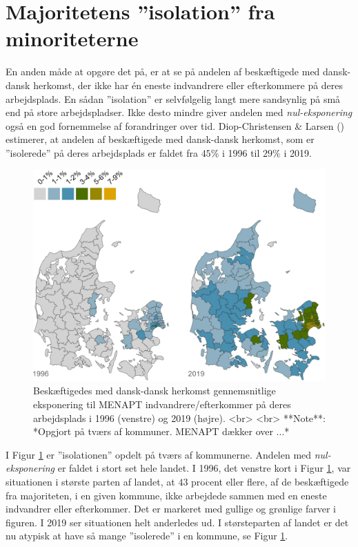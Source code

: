\documentclass[
]{book}
\begin{document}
\section{Majoritetens ''isolation'' fra minoriteterne}\label{majoritetens-isolation-fra-minoriteterne}

En anden måde at opgøre det på, er at se på andelen af beskæftigede med dansk-dansk herkomst, der ikke har én eneste indvandrere eller efterkommere på deres arbejdsplads. En sådan ''isolation'' er selvfølgelig langt mere sandsynlig på små end på store arbejdspladser. Ikke desto mindre giver andelen med \emph{nul-eksponering} også en god fornemmelse af forandringer over tid. Diop-Christensen \& Larsen () estimerer, at andelen af beskæftigede med dansk-dansk herkomst, som er ''isolerede'' på deres arbejdsplads er faldet fra \(45\%\) i 1996 til \(29\%\) i 2019.

\begin{figure}
\includegraphics[width=1\linewidth]{images/Figur_4_3} \caption{Beskæftigedes med dansk-dansk herkomst gennemsnitlige eksponering til MENAPT indvandrere/efterkommer på deres arbejdsplads i 1996 (venstre) og 2019 (højre). <br> <br> **Note**: *Opgjort på tværs af kommuner. MENAPT dækker over ...*}\label{fig:fig-5-4}
\end{figure}

I Figur \ref{fig:fig-5-4} er ''isolationen'' opdelt på tværs af kommunerne. Andelen med \emph{nul-eksponering} er faldet i stort set hele landet. I 1996, det venstre kort i Figur \ref{fig:fig-5-4}, var situationen i største parten af landet, at \(43\) procent eller flere, af de beskæftigede fra majoriteten, i en given kommune, ikke arbejdede sammen med en eneste indvandrer eller efterkommer. Det er markeret med gullige og grønlige farver i figuren. I 2019 ser situationen helt anderledes ud. I størsteparten af landet er det nu atypisk at have så mange ''isolerede'' i en kommune, se Figur \ref{fig:fig-5-4}.
\end{document}

